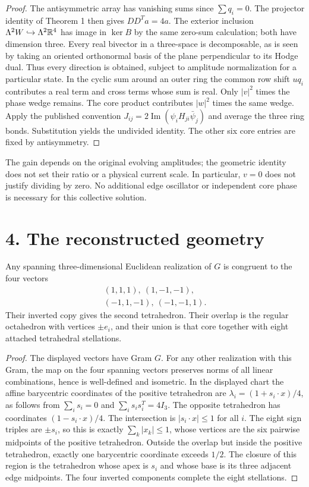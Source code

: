 \begin{proof}
The antisymmetric array has vanishing sums since $\sum q_i=0$. The projector identity of Theorem 1 then gives $DD^Ta=4a$. The exterior inclusion $\Lambda^2W\hookrightarrow\Lambda^2\mathbb R^4$ has image in $\ker B$ by the same zero-sum calculation; both have dimension three. Every real bivector in a three-space is decomposable, as is seen by taking an oriented orthonormal basis of the plane perpendicular to its Hodge dual. Thus every direction is obtained, subject to amplitude normalization for a particular state. In the cyclic sum around an outer ring the common row shift $u q_i$ contributes a real term and cross terms whose sum is real. Only $|v|^2$ times the phase wedge remains. The core product contributes $|w|^2$ times the same wedge. Apply the published convention $J_{ij}=2\operatorname{Im}(\psi_iH_{ji}\bar\psi_j)$ and average the three ring bonds. Substitution yields the undivided identity. The other six core entries are fixed by antisymmetry.
\end{proof}
The gain depends on the original evolving amplitudes; the geometric identity does not set their ratio or a physical current scale. In particular, $v=0$ does not justify dividing by zero. No additional edge oscillator or independent core phase is necessary for this collective solution.
\section*{4. The reconstructed geometry}
\begin{theorem}
Any spanning three-dimensional Euclidean realization of $G$ is congruent to the four vectors
\[
 \begin{gathered}(1,1,1),\ (1,-1,-1),\\(-1,1,-1),\ (-1,-1,1).\end{gathered}
\]
Their inverted copy gives the second tetrahedron. Their overlap is the regular octahedron with vertices $\pm e_i$, and their union is that core together with eight attached tetrahedral stellations.
\end{theorem}
\begin{proof}
The displayed vectors have Gram $G$. For any other realization with this Gram, the map on the four spanning vectors preserves norms of all linear combinations, hence is well-defined and isometric. In the displayed chart the affine barycentric coordinates of the positive tetrahedron are $\lambda_i=(1+s_i\cdot x)/4$, as follows from $\sum_i s_i=0$ and $\sum_i s_i s_i^T=4I_3$. The opposite tetrahedron has coordinates $(1-s_i\cdot x)/4$. The intersection is $|s_i\cdot x|\le1$ for all $i$. The eight sign triples are $\pm s_i$, so this is exactly $\sum_k|x_k|\le1$, whose vertices are the six pairwise midpoints of the positive tetrahedron. Outside the overlap but inside the positive tetrahedron, exactly one barycentric coordinate exceeds $1/2$. The closure of this region is the tetrahedron whose apex is $s_i$ and whose base is its three adjacent edge midpoints. The four inverted components complete the eight stellations.
\end{proof}
